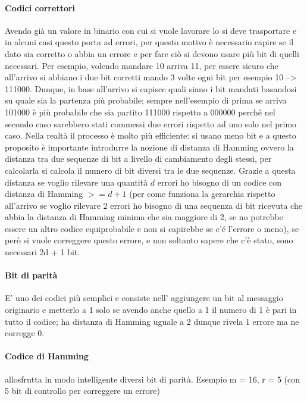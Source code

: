 \documentclass{article}
\begin{document}
\paragraph{Codici correttori}
Avendo già un valore in binario con cui si vuole lavorare lo si deve trasportare e in alcuni casi questo porta ad errori, per questo motivo è necessario capire se il dato sia corretto o abbia un errore e per fare ciò si devono usare più bit di quelli necessari. Per esempio, volendo mandare 10 arriva 11,  per essere sicuro che all'arrivo si abbiano i due bit corretti mando 3 volte ogni bit per esempio 10 --> 111000.
Dunque, in base all'arrivo si capisce quali siano i bit mandati basandosi su quale sia la partenza più probabile; sempre nell'esempio di prima se arriva 101000 è più probabile che sia partito 111000 rispetto a 000000 perché nel secondo caso sarebbero stati commessi due errori rispetto ad uno solo nel primo caso. Nella realtà il processo è molto più efficiente: si usano meno bit e a questo proposito è importante introdurre la nozione di distanza di Hamming ovvero la distanza tra due sequenze di bit a livello di cambiamento degli stessi, per calcolarla si calcola il numero di bit diversi tra le due sequenze. Grazie a questa distanza se voglio rilevare una quantità $d$ errori ho bisogno di un codice con distanza di Hamming $>= d+1$ (per come funziona la gerarchia rispetto all'arrivo se voglio rilevare 2 errori ho bisogno di una sequenza di bit ricevuta che abbia la distanza di Hamming minima che sia maggiore di 2, se no potrebbe essere un altro codice equiprobabile e non si capirebbe se c'é l'errore o meno), se però si vuole correggere questo errore, e non soltanto sapere che c'è stato, sono necessari 2d + 1 bit.

\paragraph{Bit di parità}
E' uno dei codici più semplici e consiste nell' aggiungere un bit al messaggio originario e metterlo a 1 solo se avendo anche quello a 1 il numero di 1 è pari in tutto il codice; ha distanza di Hamming uguale a 2 dunque rivela 1 errore ma ne corregge 0.

\paragraph{Codice di Hamming} allosfrutta in modo intelligente diversi bit di parità. Esempio m = 16,  r = 5 (con 5 bit di controllo per correggere un errore)
\end{document}
